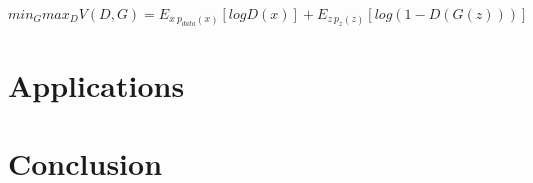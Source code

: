 \begin{equation}
    \label{eq:gan}
    min_G max_D V(D, G) = E_{x~p_{data}(x)} [log D(x)] + E_{z~p_z(z)} [log(1 - D(G(z)))]
\end{equation}

\chapter{Applications}

\chapter{Conclusion}
